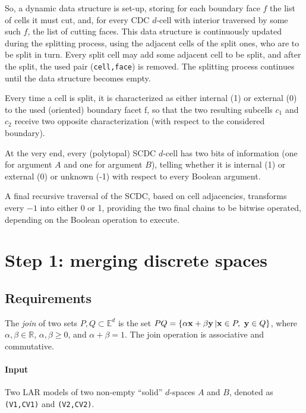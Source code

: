 \documentclass[11pt,oneside]{article}	%
\def\E{\mathbb{E}}
\def\R{\mathbb{R}}
\def\v#1{{\bf #1}}
\begin{document}
So, a dynamic data structure is set-up, storing for each boundary face $f$ the list of cells it must cut, and, for every CDC $d$-cell with interior traversed
by some such $f$, the list of cutting faces.  This data structure is continuously updated during the splitting process, using the 
adjacent cells of the split ones, who are to be split in turn.  Every split cell may add some adjacent cell to be split, and after the split,
the used pair (\texttt{cell,face}) is removed.  The splitting process continues until the data structure becomes empty.

Every time a cell is split, it is characterized as either internal (1) or external (0) to the used (oriented) boundary facet f, so that the two 
resulting subcells $c_1$ and $c_2$  receive two opposite characterization (with respect to the considered boundary).

At the very end, every (polytopal) SCDC $d$-cell has two bits of information (one for argument $A$ and one for argument $B$), telling whether it is internal  (1) or external (0) or unknown (-1) with respect to every Boolean argument.

A final recursive traversal of the SCDC, based on cell adjacencies, transforms every $-1$ into either 0 or 1, providing the two final chains to be bitwise operated, depending on the Boolean operation to execute.


\section{Step 1: merging discrete spaces}


\subsection{Requirements}

The \emph{join} of two sets $P, Q \subset \E^d$ is the set $PQ = \{\alpha \v{x} + \beta \v{y}\,| \v{x} \in P,\  \v{y} \in Q\}$,
where $\alpha, \beta \in \R$, $\alpha, \beta \geq 0$, and $\alpha + \beta = 1$. The join operation is associative and commutative.


\paragraph{Input} 
Two LAR models of two non-empty ``solid'' $d$-spaces $A$ and $B$, denoted as \texttt{(V1,CV1)} and \texttt{(V2,CV2)}. 
\end{document}
